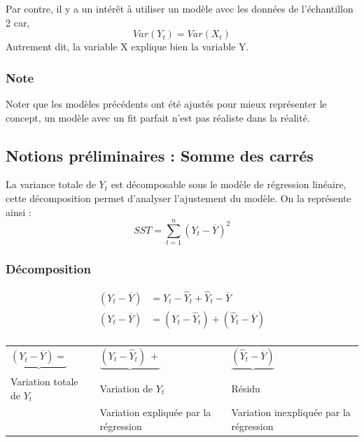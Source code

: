 \documentclass[11pt,french]{report}
\begin{document}
\bigskip
Par contre, il y a un intérêt à utiliser un modèle avec les données de l'échantillon 2 car,
$$
Var(Y_t) = Var(X_t)
$$
Autrement dit, la variable X explique bien la variable Y.

\subsubsection*{Note}
Noter que les modèles précédents  ont été ajustés pour mieux représenter le concept, un modèle avec un fit parfait n'est pas réaliste dans la réalité.

\subsection{Notions préliminaires : Somme des carrés}
La variance totale de $Y_t$ est décomposable sous le modèle de régression linéaire, cette décomposition permet d'analyser l'ajustement du modèle. On la représente ainsi :
$$
SST = \sum_{t=1}^n(Y_t-\overline{Y})^2
$$
\bigskip
\subsubsection*{Décomposition}
\begin{align*}
(Y_t - \overline{Y}) &= Y_t - \hat{Y}_t + \hat{Y}_t - \overline{Y} \\
(Y_t - \overline{Y}) &= (Y_t - \hat{Y}_t) + (\hat{Y}_t - \overline{Y}) \\
\end{align*}

\begin{center}
\begin{tabularx}{\textwidth}{XXX}
$\underbrace{(Y_t - \overline{Y}) =} $ & $\underbrace{(Y_t - \hat{Y}_t) \  +}$ & $\underbrace{(\hat{Y}_t - \overline{Y})}$ \\
Variation totale de $Y_t$ & Variation de $Y_t$ & Résidu \\
& Variation expliquée \newline par la régression & Variation inexpliquée \newline par la régression \\
\end{tabularx}
\end{center}
\end{document}
